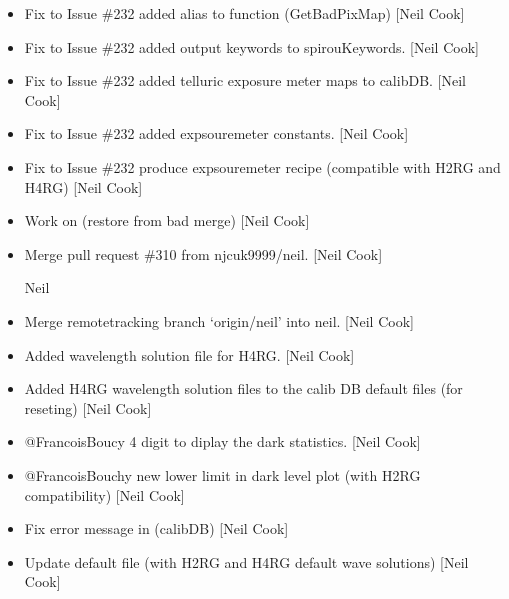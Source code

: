 \documentclass[a4paper,10pt,english]{report}
\begin{document}
\begin{itemize}
\item {} 
Fix to Issue \#232 \sphinxhyphen{} added alias to  function
(GetBadPixMap) {[}Neil Cook{]}

\item {} 
Fix to Issue \#232 \sphinxhyphen{} added output keywords to spirouKeywords. {[}Neil
Cook{]}

\item {} 
Fix to Issue \#232 \sphinxhyphen{} added telluric exposure meter maps to calibDB.
{[}Neil Cook{]}

\item {} 
Fix to Issue \#232 \sphinxhyphen{} added expsoure\sphinxhyphen{}meter constants. {[}Neil Cook{]}

\item {} 
Fix to Issue \#232 \sphinxhyphen{} produce expsoure\sphinxhyphen{}meter recipe (compatible with
H2RG and H4RG) {[}Neil Cook{]}

\item {} 
Work on  (restore from bad merge) {[}Neil Cook{]}

\item {} 
Merge pull request \#310 from njcuk9999/neil. {[}Neil Cook{]}

Neil

\item {} 
Merge remote\sphinxhyphen{}tracking branch ‘origin/neil’ into neil. {[}Neil Cook{]}

\item {} 
Added wavelength solution file for H4RG. {[}Neil Cook{]}

\item {} 
Added H4RG wavelength solution files to the calib DB default files
(for reseting) {[}Neil Cook{]}

\item {} 
@FrancoisBoucy \sphinxhyphen{} 4 digit to diplay the dark statistics. {[}Neil Cook{]}

\item {} 
@FrancoisBouchy \sphinxhyphen{} new lower limit in dark level plot (with H2RG
compatibility) {[}Neil Cook{]}

\item {} 
Fix error message in  (calibDB) {[}Neil Cook{]}

\item {} 
Update default  file (with H2RG and H4RG default
wave solutions) {[}Neil Cook{]}


\end{itemize}
\end{document}
